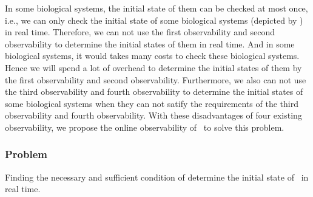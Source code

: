 In some biological systems, the initial state of them can be checked at most once, i.e., we can only check the initial state of some biological systems (depicted by \BCNs) in real time. Therefore, we can not use the first observability and second observability to determine the initial states of them in real time. And in some biological systems, it would takes many costs to check these biological systems. Hence we will spend a lot of overhead to determine the initial states of them by the first observability and second observability. Furthermore, we also can not use the third observability and fourth observability to determine the initial states of some biological systems when they can not satify the requirements of the third observability and fourth observability. With these disadvantages of four existing observability, we propose the online observability of \BCNs\ to solve this problem.
 \subsubsection*{Problem}
Finding the necessary and sufficient condition of determine the initial state of \BCNs\ in real time.